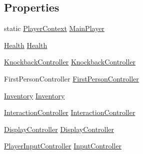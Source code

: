 \subsection*{Properties}
\begin{DoxyCompactItemize}
\item 
static \mbox{\hyperlink{class_player_context}{Player\+Context}} \mbox{\hyperlink{class_player_context_aa06169a63098a442f0aeea9acd6e370a}{Main\+Player}}
\item 
\mbox{\hyperlink{class_health}{Health}} \mbox{\hyperlink{class_player_context_a52ed48ec4a889e8f9f4dfa447e187866}{Health}}
\item 
\mbox{\hyperlink{class_knockback_controller}{Knockback\+Controller}} \mbox{\hyperlink{class_player_context_af3ed143f96e117966c827141e832ee04}{Knockback\+Controller}}
\item 
First\+Person\+Controller \mbox{\hyperlink{class_player_context_a0484c299fb5752c8a3b17fe32af7b682}{First\+Person\+Controller}}
\item 
\mbox{\hyperlink{class_inventory}{Inventory}} \mbox{\hyperlink{class_player_context_aa7148a20555b115a02f47d41689b38f8}{Inventory}}
\item 
\mbox{\hyperlink{class_interaction_controller}{Interaction\+Controller}} \mbox{\hyperlink{class_player_context_aac644a045cc99a2f430bd508769e37b0}{Interaction\+Controller}}
\item 
\mbox{\hyperlink{class_display_controller}{Display\+Controller}} \mbox{\hyperlink{class_player_context_ac989fc768d2027134bf800bd76afdd43}{Display\+Controller}}
\item 
\mbox{\hyperlink{class_player_input_controller}{Player\+Input\+Controller}} \mbox{\hyperlink{class_player_context_a3d16df55c3ec097dfd89f0560cedbfce}{Input\+Controller}}
\end{DoxyCompactItemize}


